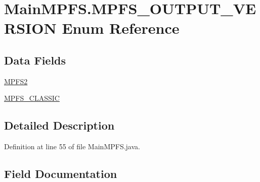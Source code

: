 \hypertarget{enum_microchip_m_p_f_s_1_1_main_m_p_f_s_1_1_m_p_f_s___o_u_t_p_u_t___v_e_r_s_i_o_n}{}\section{Main\+M\+P\+F\+S.\+M\+P\+F\+S\+\_\+\+O\+U\+T\+P\+U\+T\+\_\+\+V\+E\+R\+S\+I\+O\+N Enum Reference}
\label{enum_microchip_m_p_f_s_1_1_main_m_p_f_s_1_1_m_p_f_s___o_u_t_p_u_t___v_e_r_s_i_o_n}
\subsection*{Data Fields}
\begin{DoxyCompactItemize}
\item 
\hyperlink{enum_microchip_m_p_f_s_1_1_main_m_p_f_s_1_1_m_p_f_s___o_u_t_p_u_t___v_e_r_s_i_o_n_a5a92d98af3b89fdd193668f0fe3dedb8}{M\+P\+F\+S2}
\item 
\hyperlink{enum_microchip_m_p_f_s_1_1_main_m_p_f_s_1_1_m_p_f_s___o_u_t_p_u_t___v_e_r_s_i_o_n_ac437c2468b108192ddb4a23488d8be53}{M\+P\+F\+S\+\_\+\+C\+L\+A\+S\+S\+I\+C}
\end{DoxyCompactItemize}


\subsection{Detailed Description}


Definition at line 55 of file Main\+M\+P\+F\+S.\+java.



\subsection{Field Documentation}
\hypertarget{enum_microchip_m_p_f_s_1_1_main_m_p_f_s_1_1_m_p_f_s___o_u_t_p_u_t___v_e_r_s_i_o_n_a5a92d98af3b89fdd193668f0fe3dedb8}{}

